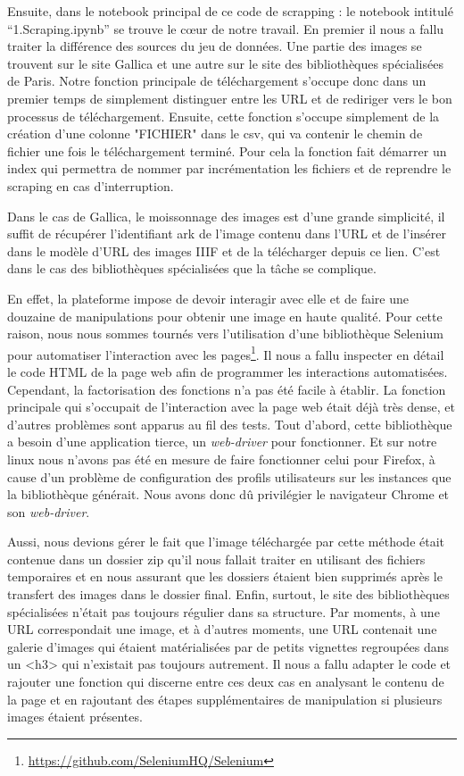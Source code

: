 Ensuite, dans le notebook principal de ce code de scrapping : le notebook intitulé \enquote{1.Scraping.ipynb} se trouve le cœur de notre travail. En premier il nous a fallu traiter la différence des sources du jeu de données. Une partie des images se trouvent sur le site Gallica et une autre sur le site des bibliothèques spécialisées de Paris. Notre fonction principale de téléchargement s'occupe donc dans un premier temps de simplement distinguer entre les URL et de rediriger vers le bon processus de téléchargement. Ensuite, cette fonction s'occupe simplement de la création d'une colonne "FICHIER" dans le csv, qui va contenir le chemin de fichier une fois le téléchargement terminé. Pour cela la fonction fait démarrer un index qui permettra de nommer par incrémentation les fichiers et de reprendre le scraping en cas d'interruption.

Dans le cas de Gallica, le moissonnage des images est d'une grande simplicité, il suffit de récupérer l'identifiant ark de l'image contenu dans l'URL et de l'insérer dans le modèle d'URL des images IIIF et de la télécharger depuis ce lien. C'est dans le cas des bibliothèques spécialisées que la tâche se complique. 

En effet, la plateforme impose de devoir interagir avec elle et de faire une douzaine de manipulations pour obtenir une image en haute qualité. Pour cette raison, nous nous sommes tournés vers l'utilisation d'une bibliothèque Selenium pour automatiser l'interaction avec les pages\footnote{\url{https://github.com/SeleniumHQ/Selenium}}. Il nous a fallu inspecter en détail le code HTML de la page web afin de programmer les interactions automatisées. Cependant, la factorisation des fonctions n'a pas été facile à établir. La fonction principale qui s'occupait de l'interaction avec la page web était déjà très dense, et d'autres problèmes sont apparus au fil des tests. Tout d'abord, cette bibliothèque a besoin d'une application tierce, un \textit{web-driver} pour fonctionner. Et sur notre linux nous n'avons pas été en mesure de faire fonctionner celui pour Firefox, à cause d'un problème de configuration des profils utilisateurs sur les instances que la bibliothèque générait. Nous avons donc dû privilégier le navigateur Chrome et son \textit{web-driver}. 

Aussi, nous devions gérer le fait que l'image téléchargée par cette méthode était contenue dans un dossier zip qu'il nous fallait traiter en utilisant des fichiers temporaires et en nous assurant que les dossiers étaient bien supprimés après le transfert des images dans le dossier final. Enfin, surtout, le site des bibliothèques spécialisées n'était pas toujours régulier dans sa structure. Par moments, à une URL correspondait une image, et à d'autres moments, une URL contenait une galerie d'images qui étaient matérialisées par de petits vignettes regroupées dans un <h3> qui n'existait pas toujours autrement. Il nous a fallu adapter le code et rajouter une fonction qui discerne entre ces deux cas en analysant le contenu de la page et en rajoutant des étapes supplémentaires de manipulation si plusieurs images étaient présentes.

